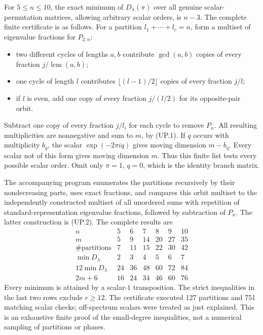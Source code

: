 For $5\le n\le10$, the exact minimum of $D_\lambda(\pi)$ over
all genuine scalar-permutation matrices, allowing arbitrary scalar
orders, is $n-3$.  The complete finite certificate is as follows.
For a partition $l_1+\cdots+l_c=n$, form a multiset of eigenvalue
fractions for $P_{2,n}$:
\begin{itemize}
 \item two different cycles of lengths $a,b$ contribute
 $\gcd(a,b)$ copies of every fraction $j/\operatorname{lcm}(a,b)$;
 \item one cycle of length $l$ contributes
 $\lfloor(l-1)/2\rfloor$ copies of every fraction $j/l$;
 \item if $l$ is even, add one copy of every fraction $j/(l/2)$
 for its opposite-pair orbit.
\end{itemize}
Subtract one copy of every fraction $j/l_i$ for each cycle to
remove $P_n$.  All resulting multiplicities are nonnegative and
sum to $m$, by (UP.1).  If $q$ occurs with multiplicity $b_q$,
the scalar $\exp(-2\pi iq)$ gives moving dimension $m-b_q$.
Every scalar not of this form gives moving dimension $m$.
Thus this finite list tests every possible scalar order.
Omit only $\pi=1$, $q=0$, which is the identity branch matrix.

The accompanying program enumerates the partitions recursively by
their nondecreasing parts, uses exact fractions, and compares this
orbit multiset to the independently constructed multiset of all
unordered sums with repetition of standard-representation
eigenvalue fractions, followed by subtraction of $P_n$.
The latter construction is (UP.2).
The complete results are
\[
\begin{array}{c|rrrrrr}
 n&5&6&7&8&9&10\\ \hline
 m&5&9&14&20&27&35\\
 \#\text{partitions}&7&11&15&22&30&42\\
 \min D_\lambda&2&3&4&5&6&7\\
 12\min D_\lambda&24&36&48&60&72&84\\
 2m+6&16&24&34&46&60&76
\end{array}                                                     \tag{UP.10}
\]
Every minimum is attained by a scalar-$1$ transposition.
The strict inequalities in the last two rows exclude $r\ge12$.
The certificate executed 127 partitions and 751 matching scalar
checks; off-spectrum scalars were treated as just explained.
This is an exhaustive finite proof of the small-degree inequalities,
not a numerical sampling of partitions or phases.

